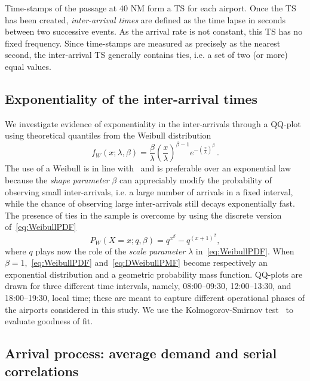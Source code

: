 \documentclass[draft,review]{elsarticle}
\makeatletter
\newcommand*{\ie}{i.e.\@\xspace}
\makeatother
\begin{document}
Time-stamps of the passage at 40 NM form a \ac{TS} for each airport.
Once the \ac{TS} has been created, \emph{inter-arrival times} are defined as the time lapse in seconds between two successive events. As the arrival rate is not constant, this \ac{TS} has no fixed frequency.
Since time-stamps are measured as precisely as the nearest second, the inter-arrival \ac{TS} generally contains ties, \ie{} a set of two (or more) equal values.

\subsection{Exponentiality of the inter-arrival times}\label{sec:dm_exp}

We investigate evidence of exponentiality in the inter-arrivals through a QQ-plot using theoretical quantiles from the Weibull distribution
\begin{equation}
    f_W(x; \lambda, \beta) = \frac{\beta}{\lambda} \left(\frac{x}{\lambda}\right)^{\beta-1} e^{-(\frac{x}{\lambda})^\beta} \,.
    \label{eq:WeibullPDF}
\end{equation}
The use of a Weibull is in line with~\citet{willemain2004statistical} and is preferable over an exponential law because the \emph{shape parameter} \(\beta\) can appreciably modify the probability of observing small inter-arrivals, \ie{} a large number of arrivals in a fixed interval, while the chance of observing large inter-arrivals still decays exponentially fast.
The presence of ties in the sample is overcome by using the discrete version of~\eqref{eq:WeibullPDF}~\citep{nakagawa1975discrete,barbiero2013discrete}
\begin{equation}
    P_W(X=x;q,\beta) = q^{x^\beta} - q^{(x+1)^\beta},
    \label{eq:DWeibullPMF}
\end{equation}
where \(q\) plays now the role of the \emph{scale parameter} \(\lambda\) in~\eqref{eq:WeibullPDF}.
When \(\beta = 1\),~\eqref{eq:WeibullPDF} and~\eqref{eq:DWeibullPMF} become respectively an exponential distribution and a geometric probability mass function.
QQ-plots are drawn for three different time intervals, namely, 08:00--09:30, 12:00--13:30, and 18:00--19:30, local time; these are meant to capture different operational phases of the airports considered in this study.
We use the Kolmogorov-Smirnov test~\citep{taylor2011nonparam} to evaluate goodness of fit.

\subsection{Arrival process: average demand and serial correlations}\label{sec:dm_serial_corr}
\end{document}
